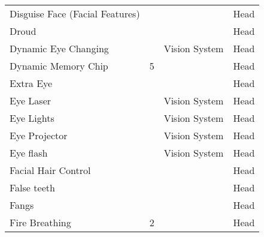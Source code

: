 \documentclass[twoside]{book}
\begin{document}
\begin{longtable}{p{1.25in}p{2em}ll}
  \raggedright
           Disguise Face (Facial Features)
           
  &
  
  &
  
  &
   Head 
  \tabularnewline
      
  \raggedright
           Droud 
  &
  
  &
  
  &
   Head 
  \tabularnewline
      
  \raggedright
           Dynamic Eye Changing 
  &
  
  &
   Vision System 
  &
   Head 
  \tabularnewline
      
  \raggedright
           Dynamic Memory Chip 
  &
   5 
  &
  
  &
   Head 
  \tabularnewline
      
  \raggedright
           Extra Eye 
  &
  
  &
  
  &
   Head 
  \tabularnewline
      
  \raggedright
           Eye Laser 
  &
  
  &
   Vision System 
  &
   Head 
  \tabularnewline
      
  \raggedright
           Eye Lights 
  &
  
  &
   Vision System 
  &
   Head 
  \tabularnewline
      
  \raggedright
           Eye Projector 
  &
  
  &
   Vision System 
  &
   Head 
  \tabularnewline
      
  \raggedright
           Eye flash 
  &
  
  &
   Vision System 
  &
   Head 
  \tabularnewline
      
  \raggedright
           Facial Hair Control 
  &
  
  &
  
  &
   Head 
  \tabularnewline
      
  \raggedright
           False teeth 
  &
  
  &
  
  &
   Head 
  \tabularnewline
      
  \raggedright
           Fangs 
  &
  
  &
  
  &
   Head 
  \tabularnewline
      
  \raggedright
           Fire Breathing 
  &
   2 
  &
  
  &
   Head 
  \tabularnewline
      

\end{longtable}
\end{document}
